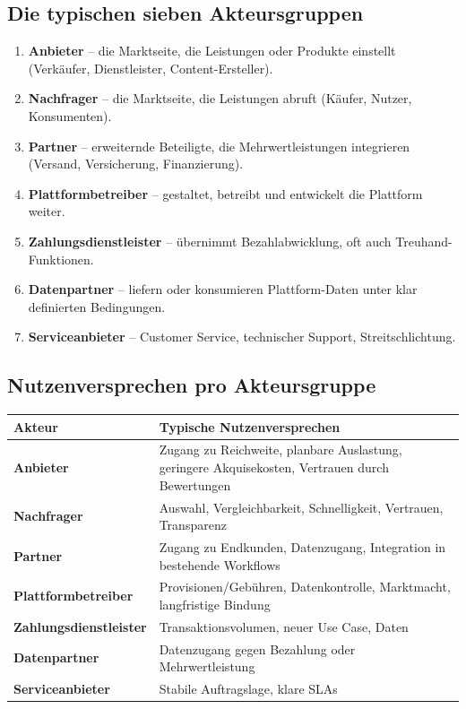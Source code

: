 \documentclass[11pt,a4paper,oneside]{article}
\newcommand{\fachbegriff}[1]{\textbf{#1}}
\begin{document}
\subsection{Die typischen sieben Akteursgruppen}

\begin{enumerate}
  \item \fachbegriff{Anbieter} -- die Marktseite, die Leistungen oder Produkte einstellt (Verkäufer, Dienstleister, Content-Ersteller).
  \item \fachbegriff{Nachfrager} -- die Marktseite, die Leistungen abruft (Käufer, Nutzer, Konsumenten).
  \item \fachbegriff{Partner} -- erweiternde Beteiligte, die Mehrwertleistungen integrieren (Versand, Versicherung, Finanzierung).
  \item \fachbegriff{Plattformbetreiber} -- gestaltet, betreibt und entwickelt die Plattform weiter.
  \item \fachbegriff{Zahlungsdienstleister} -- übernimmt Bezahlabwicklung, oft auch Treuhand-Funktionen.
  \item \fachbegriff{Datenpartner} -- liefern oder konsumieren Plattform-Daten unter klar definierten Bedingungen.
  \item \fachbegriff{Serviceanbieter} -- Customer Service, technischer Support, Streitschlichtung.
\end{enumerate}

\subsection{Nutzenversprechen pro Akteursgruppe}

\begin{tabularx}{\linewidth}{@{}>{\bfseries}lX@{}}
\toprule
Akteur & Typische Nutzenversprechen \\
\midrule
Anbieter            & Zugang zu Reichweite, planbare Auslastung, geringere Akquisekosten, Vertrauen durch Bewertungen \\
Nachfrager          & Auswahl, Vergleichbarkeit, Schnelligkeit, Vertrauen, Transparenz \\
Partner             & Zugang zu Endkunden, Datenzugang, Integration in bestehende Workflows \\
Plattformbetreiber  & Provisionen/Gebühren, Datenkontrolle, Marktmacht, langfristige Bindung \\
Zahlungsdienstleister & Transaktionsvolumen, neuer Use Case, Daten \\
Datenpartner        & Datenzugang gegen Bezahlung oder Mehrwertleistung \\
Serviceanbieter     & Stabile Auftragslage, klare SLAs \\
\bottomrule
\end{tabularx}
\end{document}
